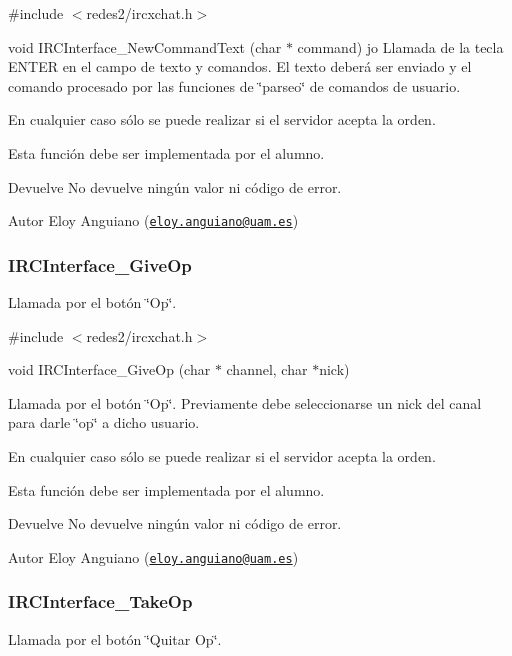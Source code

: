 \#include $<$redes2/ircxchat.\-h$>$

void I\-R\-C\-Interface\-\_\-\-New\-Command\-Text (char $\ast$ command) jo  Llamada de la tecla E\-N\-T\-E\-R en el campo de texto y comandos. El texto deberá ser enviado y el comando procesado por las funciones de \char`\"{}parseo\char`\"{} de comandos de usuario.

En cualquier caso sólo se puede realizar si el servidor acepta la orden.

Esta función debe ser implementada por el alumno.

\begin{DoxyReturn}{Devuelve}
No devuelve ningún valor ni código de error.
\end{DoxyReturn}
\begin{DoxyAuthor}{Autor}
Eloy Anguiano (\href{mailto:eloy.anguiano@uam.es}{\tt eloy.\-anguiano@uam.\-es})
\end{DoxyAuthor}


 \hypertarget{IRCInterface_GiveOp}{}\subsubsection{I\-R\-C\-Interface\-\_\-\-Give\-Op}\label{IRCInterface_GiveOp}
Llamada por el botón \char`\"{}\-Op\char`\"{}.

\#include $<$redes2/ircxchat.\-h$>$

void I\-R\-C\-Interface\-\_\-\-Give\-Op (char $\ast$ channel, char $\ast$nick)

Llamada por el botón \char`\"{}\-Op\char`\"{}. Previamente debe seleccionarse un nick del canal para darle \char`\"{}op\char`\"{} a dicho usuario.

En cualquier caso sólo se puede realizar si el servidor acepta la orden.

Esta función debe ser implementada por el alumno.

\begin{DoxyReturn}{Devuelve}
No devuelve ningún valor ni código de error.
\end{DoxyReturn}
\begin{DoxyAuthor}{Autor}
Eloy Anguiano (\href{mailto:eloy.anguiano@uam.es}{\tt eloy.\-anguiano@uam.\-es})
\end{DoxyAuthor}


 \hypertarget{IRCInterface_TakeOp}{}\subsubsection{I\-R\-C\-Interface\-\_\-\-Take\-Op}\label{IRCInterface_TakeOp}
Llamada por el botón \char`\"{}\-Quitar Op\char`\"{}.


